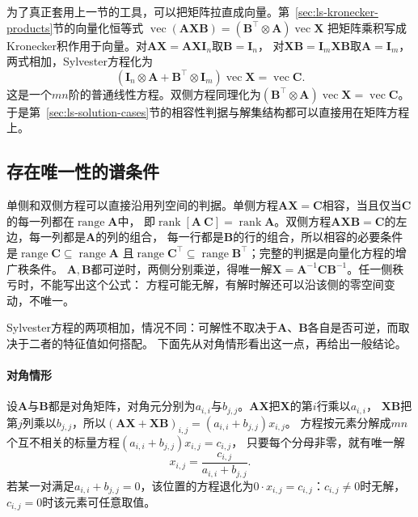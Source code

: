 为了真正套用上一节的工具，可以把矩阵拉直成向量。第~\ref{sec:ls-kronecker-products}节的向量化恒等式
$\operatorname{vec}(\bm A\bm X\bm B)=(\bm B^\top\otimes\bm A)\operatorname{vec}\bm X$
把矩阵乘积写成Kronecker积作用于向量。对$\bm A\bm X=\bm A\bm X\bm I_n$取$\bm B=\bm I_n$，
对$\bm X\bm B=\bm I_m\bm X\bm B$取$\bm A=\bm I_m$，两式相加，Sylvester方程化为
\begin{equation}
 (\bm I_n\otimes\bm A+\bm B^\top\otimes\bm I_m)\operatorname{vec}\bm X
 =\operatorname{vec}\bm C.
 \label{eq:ls-sylvester-vectorized}
\end{equation}
这是一个$mn$阶的普通线性方程。双侧方程同理化为$(\bm B^\top\otimes\bm A)\operatorname{vec}\bm X=\operatorname{vec}\bm C$。
于是第~\ref{sec:ls-solution-cases}节的相容性判据与解集结构都可以直接用在矩阵方程上。

\subsection{存在唯一性的谱条件}
\label{sec:ls-matrix-equation-existence}

单侧和双侧方程可以直接沿用列空间的判据。单侧方程$\bm A\bm X=\bm C$相容，当且仅当$\bm C$的每一列都在$\operatorname{range}\bm A$中，
即$\operatorname{rank}[\bm A\ \bm C]=\operatorname{rank}\bm A$。双侧方程$\bm A\bm X\bm B=\bm C$的左边，每一列都是$\bm A$的列的组合，
每一行都是$\bm B$的行的组合，所以相容的必要条件是$\operatorname{range}\bm C\subseteq\operatorname{range}\bm A$
且$\operatorname{range}\bm C^\top\subseteq\operatorname{range}\bm B^\top$；完整的判据是向量化方程的增广秩条件。
$\bm A,\bm B$都可逆时，两侧分别乘逆，得唯一解$\bm X=\bm A^{-1}\bm C\bm B^{-1}$。任一侧秩亏时，不能写出这个公式：
方程可能无解，有解时解还可以沿该侧的零空间变动，不唯一。

Sylvester方程的两项相加，情况不同：可解性不取决于$\bm A$、$\bm B$各自是否可逆，而取决于二者的特征值如何搭配。
下面先从对角情形看出这一点，再给出一般结论。

\paragraph{对角情形}

设$\bm A$与$\bm B$都是对角矩阵，对角元分别为$a_{i,i}$与$b_{j,j}$。$\bm A\bm X$把$\bm X$的第$i$行乘以$a_{i,i}$，
$\bm X\bm B$把第$j$列乘以$b_{j,j}$，所以$(\bm A\bm X+\bm X\bm B)_{i,j}=(a_{i,i}+b_{j,j})x_{i,j}$。
方程按元素分解成$mn$个互不相关的标量方程$(a_{i,i}+b_{j,j})x_{i,j}=c_{i,j}$，
只要每个分母非零，就有唯一解
\begin{equation}
 x_{i,j}=\frac{c_{i,j}}{a_{i,i}+b_{j,j}}.
 \label{eq:ls-sylvester-diagonal-closed-form}
\end{equation}
若某一对满足$a_{i,i}+b_{j,j}=0$，该位置的方程退化为$0\cdot x_{i,j}=c_{i,j}$：$c_{i,j}\neq0$时无解，$c_{i,j}=0$时该元素可任意取值。

